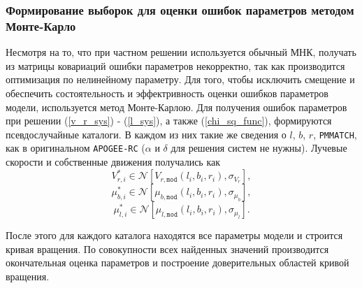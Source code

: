 \documentclass{matmex-diploma-custom}
\begin{document}
\subsubsection{Формирование выборок для оценки ошибок параметров методом Монте-Карло} \label{mk}
Несмотря на то, что при частном решении используется обычный МНК, получать из матрицы ковариаций ошибки параметров некорректно, так как производится оптимизация по нелинейному параметру. Для того, чтобы исключить смещение и обеспечить состоятельность и эффектривность оценки ошибков параметров модели, используется метод Монте-Карлою. Для получения ошибок параметров при решении (\ref{v_r_sys}) - (\ref{l_sys}), а также (\ref{chi_sq_func}), формируются псевдослучайные каталоги. В каждом из них такие же сведения о $l$, $b$, $r$, \texttt{PMMATCH}, как в оригинальном \texttt{APOGEE-RC} ($\alpha$ и $\delta$ для решения систем не нужны). Лучевые скорости и собственные движения получались как
\begin{equation}
        V_{r, i}^{*} \in \mathcal{N} \left[ V_{r, \texttt{mod}}(l_i, b_i, r_i),\sigma_{V_r} \right],
\end{equation}
\begin{equation}
        \mu_{b, i}^{*} \in \mathcal{N} \left[ \mu_{b, \texttt{mod}}(l_i, b_i, r_i),\sigma_{\mu_b} \right],
\end{equation}
\begin{equation}
        \mu_{l, i}^{*} \in \mathcal{N} \left[ \mu_{l, \texttt{mod}}(l_i, b_i, r_i),\sigma_{\mu_l} \right].
\end{equation}
\par После этого для каждого каталога находятся все параметры модели и строится кривая вращения. По совокупности всех найденных значений производится окончательная оценка параметров и построение доверительных областей кривой вращения.
\pagebreak
\end{document}
